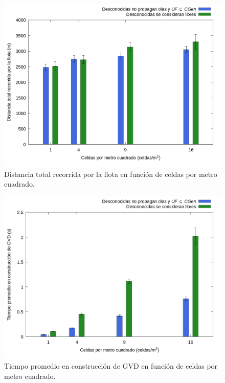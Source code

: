 \begin{figure}[H]
  \centerfloat

  \includegraphics[clip=true, width=\graphlen]{imagenes/graficas_chicas/graficas_histo_num/desconocido/exploration_cost.png}

  \caption{Distancia total recorrida por la flota en función de celdas por metro cuadrado.}\label{fig:gra:des:ec}

\end{figure}

\begin{figure}[H]
  \centerfloat

  \includegraphics[clip=true, width=\graphlen]{imagenes/graficas_chicas/graficas_histo_num/desconocido/gvd_construction_time_mean.png}

  \caption{Tiempo promedio en construcción de GVD en función de celdas por metro cuadrado.}\label{fig:gra:des:gvdt}

\end{figure}

